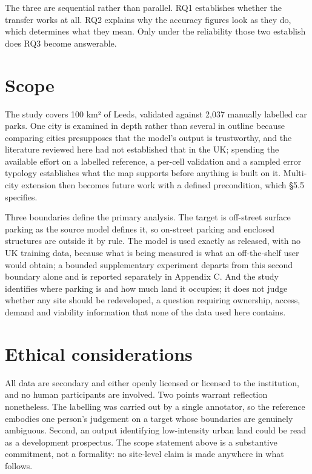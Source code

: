 The three are sequential rather than parallel. RQ1 establishes whether the transfer works at all. RQ2 explains why the accuracy figures look as they do, which determines what they mean. Only under the reliability those two establish does RQ3 become answerable.

\hypertarget{scope}{%
\section{Scope}\label{scope}}

The study covers 100 km² of Leeds, validated against 2,037 manually labelled car parks. One city is examined in depth rather than several in outline because comparing cities presupposes that the model's output is trustworthy, and the literature reviewed here had not established that in the UK; spending the available effort on a labelled reference, a per-cell validation and a sampled error typology establishes what the map supports before anything is built on it. Multi-city extension then becomes future work with a defined precondition, which §5.5 specifies.

Three boundaries define the primary analysis. The target is off-street surface parking as the source model defines it, so on-street parking and enclosed structures are outside it by rule. The model is used exactly as released, with no UK training data, because what is being measured is what an off-the-shelf user would obtain; a bounded supplementary experiment departs from this second boundary alone and is reported separately in Appendix C. And the study identifies where parking is and how much land it occupies; it does not judge whether any site should be redeveloped, a question requiring ownership, access, demand and viability information that none of the data used here contains.

\hypertarget{ethical-considerations}{%
\section{Ethical considerations}\label{ethical-considerations}}

All data are secondary and either openly licensed or licensed to the institution, and no human participants are involved. Two points warrant reflection nonetheless. The labelling was carried out by a single annotator, so the reference embodies one person's judgement on a target whose boundaries are genuinely ambiguous. Second, an output identifying low-intensity urban land could be read as a development prospectus. The scope statement above is a substantive commitment, not a formality: no site-level claim is made anywhere in what follows.

